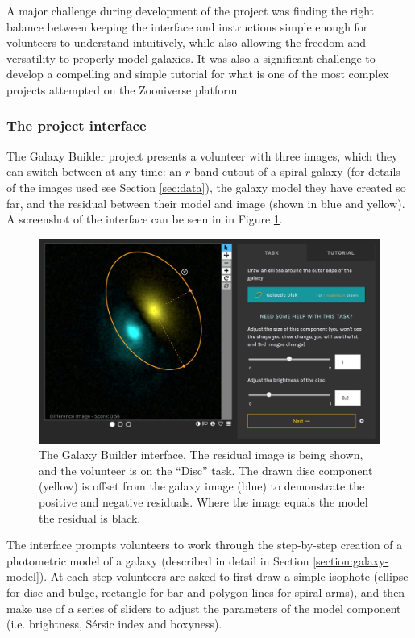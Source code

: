 \documentclass[../main.tex]{subfiles}
\begin{document}
A major challenge during development of the project was finding the right balance between keeping the interface and instructions simple enough for volunteers to understand intuitively, while also allowing the freedom and versatility to properly model galaxies. It was also a significant challenge to develop a compelling and simple tutorial for what is one of the most complex projects attempted on the Zooniverse platform.

\subsubsection{The project interface}

The Galaxy Builder project presents a volunteer with three images, which they can switch between at any time: an $r$-band cutout of a spiral galaxy (for details of the images used see Section \ref{sec:data}), the galaxy model they have created so far, and the residual between their model and image (shown in blue and yellow). A screenshot of the interface can be seen in in Figure \ref{fig:interfaceInProgress}.

\begin{figure}
  \includegraphics[width=17.7cm]{images/interfaceInProgress.jpg}
  \caption{The Galaxy Builder interface. The residual image is being shown, and the volunteer is on the ``Disc'' task. The drawn disc component (yellow) is offset from the galaxy image (blue) to demonstrate the positive and negative residuals. Where the image equals the model the residual is black.}
  \label{fig:interfaceInProgress}
\end{figure}

The interface prompts volunteers to work through the step-by-step creation of a photometric model of a galaxy (described in detail in Section \ref{section:galaxy-model}). At each step volunteers are asked to first draw a simple isophote (ellipse for disc and bulge, rectangle for bar and polygon-lines for spiral arms), and then make use of a series of sliders to adjust the parameters of the model component (i.e. brightness, S\'ersic index and boxyness).
\end{document}
